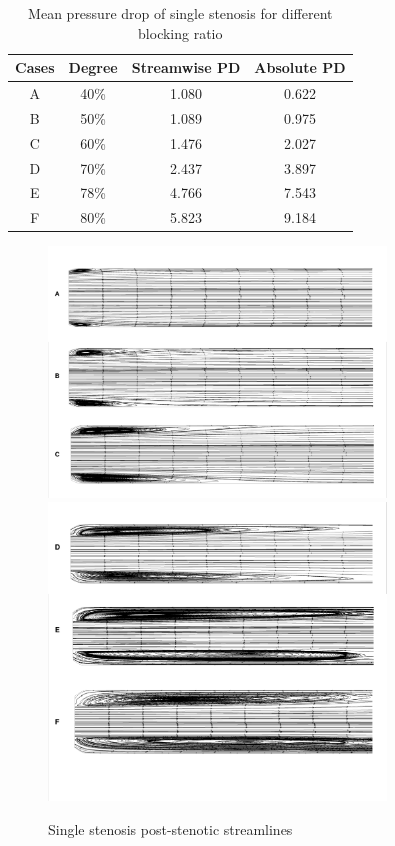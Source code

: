 \begin{table}[h]
	\caption{Mean pressure drop of single stenosis for different blocking ratio}
	\vspace{-5pt}
	\begin{center}
		\begin{tabular}{|c|c|c|c|}
			\hline
			\textbf{Cases} &\textbf{Degree} & \textbf{Streamwise PD} & \textbf{Absolute PD}\\
			\hline
			A & 40\% & 1.080 & 0.622\\
			\hline
			B & 50\% & 1.089 & 0.975\\
			\hline
			C & 60\% & 1.476 & 2.027\\
			\hline
			D & 70\% & 2.437 & 3.897\\
			\hline
			E & 78\% & 4.766 & 7.543\\
			\hline
			F & 80\% & 5.823 & 9.184\\
			\hline
		\end{tabular}
	\end{center} 
\end{table}

\begin{figure}[H]
	\centering
	\includegraphics[trim= 1mm 1mm 1mm 0mm,clip,width=0.80\textwidth]{./pics/4to6.png}
	\includegraphics[trim= 1mm 0mm 1mm 0mm,clip,width=0.80\textwidth]{./pics/7to8.png}
	\caption{Single stenosis post-stenotic streamlines}
	\label{fig:single post streamlines}
\end{figure}

